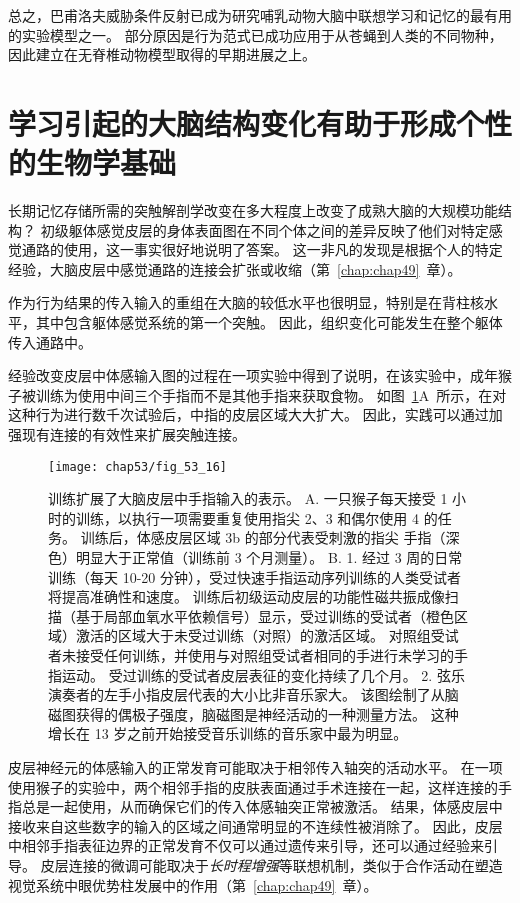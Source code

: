 总之，巴甫洛夫威胁条件反射已成为研究哺乳动物大脑中联想学习和记忆的最有用的实验模型之一。
部分原因是行为范式已成功应用于从苍蝇到人类的不同物种，因此建立在无脊椎动物模型取得的早期进展之上。



\section{学习引起的大脑结构变化有助于形成个性的生物学基础}

长期记忆存储所需的突触解剖学改变在多大程度上改变了成熟大脑的大规模功能结构？
初级躯体感觉皮层的身体表面图在不同个体之间的差异反映了他们对特定感觉通路的使用，这一事实很好地说明了答案。
这一非凡的发现是根据个人的特定经验，大脑皮层中感觉通路的连接会扩张或收缩（第~\ref{chap:chap49}~章）。


作为行为结果的传入输入的重组在大脑的较低水平也很明显，特别是在背柱核水平，其中包含躯体感觉系统的第一个突触。
因此，组织变化可能发生在整个躯体传入通路中。


经验改变皮层中体感输入图的过程在一项实验中得到了说明，在该实验中，成年猴子被训练为使用中间三个手指而不是其他手指来获取食物。
如图~\ref{fig:53_16}A~所示，在对这种行为进行数千次试验后，中指的皮层区域大大扩大。
因此，实践可以通过加强现有连接的有效性来扩展突触连接。


\begin{figure}[htbp]
	\centering
	\texttt{[image: chap53/fig\_53\_16]}
	\caption{训练扩展了大脑皮层中手指输入的表示。
		A. 一只猴子每天接受 1 小时的训练，以执行一项需要重复使用指尖 2、3 和偶尔使用 4 的任务。
		训练后，体感皮层区域 3b 的部分代表受刺激的指尖 手指（深色）明显大于正常值（训练前 3 个月测量）\cite{jenkins1990functional}。
		B. 1. 经过 3 周的日常训练（每天 10-20 分钟），受过快速手指运动序列训练的人类受试者将提高准确性和速度。
		训练后初级运动皮层的功能性磁共振成像扫描（基于局部血氧水平依赖信号）显示，受过训练的受试者（橙色区域）激活的区域大于未受过训练（对照）的激活区域。
		对照组受试者未接受任何训练，并使用与对照组受试者相同的手进行未学习的手指运动。
		受过训练的受试者皮层表征的变化持续了几个月。
		2. 弦乐演奏者的左手小指皮层代表的大小比非音乐家大。
		该图绘制了从脑磁图获得的偶极子强度，脑磁图是神经活动的一种测量方法。
		这种增长在 13 岁之前开始接受音乐训练的音乐家中最为明显\cite{elbert1995increased}。}
	\label{fig:53_16}
\end{figure}


皮层神经元的体感输入的正常发育可能取决于相邻传入轴突的活动水平。
在一项使用猴子的实验中，两个相邻手指的皮肤表面通过手术连接在一起，这样连接的手指总是一起使用，从而确保它们的传入体感轴突正常被激活。
结果，体感皮层中接收来自这些数字的输入的区域之间通常明显的不连续性被消除了。
因此，皮层中相邻手指表征边界的正常发育不仅可以通过遗传来引导，还可以通过经验来引导。
皮层连接的微调可能取决于\textit{长时程增强}等联想机制，类似于合作活动在塑造视觉系统中眼优势柱发展中的作用（第~\ref{chap:chap49}~章）。


